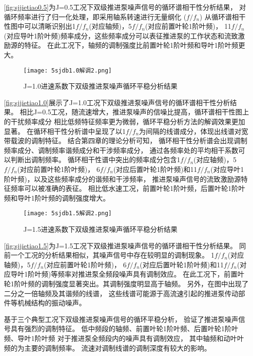 \autoref{fig:sjjietiao0.5}为J=0.5工况下双级推进泵噪声信号的循环谱相干性分析结果，
对循环频率进行了归一化处理，即采用轴系转速进行无量纲化 ($f/f_n$)
从循环谱相干性图中可以清晰识别出1$f/f_n$(对应轴频)，5$f/f_n$(对应前置叶轮1阶叶频)，
11$f/f_n$(对应导叶1阶叶频)频率成分，这些频率成分可以表征推进泵的工作状态和流致激励源的特征。
在此工况下，轴频的调制强度比前置叶轮1阶叶频和导叶1阶叶频更大。
\begin{comment}
\end{comment}
\begin{figure}[htbp]
    \centering
    \texttt{[image: 5sjdb1.0解调2.png]}
    \caption{\label{fig:sjjietiao1.0}J=1.0进速系数下双级推进泵噪声循环平稳分析结果}
\end{figure}

\autoref{fig:sjjietiao1.0}展示了J=1.0工况下双级推进泵噪声信号的循环谱相干性分析结果。
相比J=0.5工况，随流速增大，推进泵噪声的信噪比提高，循环谱相干性图上的干扰频率成分
相比低频特征频率更为微弱，循环平稳分析方法的解调效果更加显著。
在循环相干性分析谱中呈现了以1$f/f_n$为间隔的线谱成分，体现出线谱对宽带载波的调制特征。
结合第四章的理论分析可知，
循环相干性分析谱会出现调制频率成分、调制频率谐频成分和干涉频率成分，
通过各频率处的平均相干系数可以判断出调制频率。
循环相干性谱中突出的频率成分包含1$f/f_n$(对应轴频)，5$f/f_n$(对应前置叶轮1阶叶频)，
6$f/f_n$(对应后置叶轮1阶叶频)和11$f/f_n$(对应导叶1阶叶频)，以及这些频率成分的谐频和干涉频率，
推进泵噪声信号的流致激励源特征频率可以被准确的表征。
相比低水速工况，前置叶轮1阶叶频，后置叶轮1阶叶频和导叶1阶叶频的调制强度增大。
\begin{figure}[htbp]
    \centering
    \texttt{[image: 5sjdb1.5解调2.png]}
    \caption{\label{fig:sjjietiao1.5}J=1.5进速系数下双级推进泵噪声循环平稳分析结果}
\end{figure}

\autoref{fig:sjjietiao1.5}为J=1.5工况下双级推进泵噪声信号的循环谱相干性分析结果。
同前一个工况的分析结果相似，其噪声信号中存在较明显的调制现象。
1$f/f_n$(对应轴频)，5$f/f_n$(对应前置叶轮1阶叶频)，
6$f/f_n$(对应后置叶轮1阶叶频)和11$f/f_n$(对应导叶1阶叶频)等频率对推进泵全频段噪声具有调制效应。
在此工况下，前置叶轮1阶叶频的调制强度显著突出。其调制强度明显高于轴频。
另外，在图中出现了二分之一倍轴频及其谐频的线谱，
这些线谱可能源于高流速引起的推进泵传动部件等机械结构的振动噪声。

基于三个典型工况下双级推进泵噪声信号的循环平稳分析，
验证了推进泵噪声信号具有强烈的调制特征。
低中频段的轴频、前置叶轮1阶叶频、后置叶轮1阶叶频、导叶1阶叶频
对于推进泵全频段内的噪声具有调制效应，
其中轴频和动叶叶频的为主要的调制频率。
流速对调制线谱的调制深度有较大的影响。

